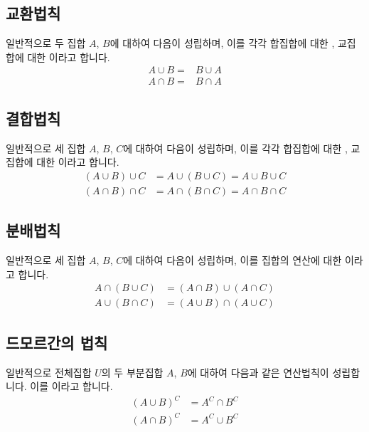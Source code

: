 \clearpage
\subsection{교환법칙}
일반적으로 두 집합 $A$, $B$에 대하여 다음이 성립하며, 이를 각각 합집합에 대한 , 교집합에 대한 이라고 합니다.
\begin{align*}
    A\cup B =& B \cup A\\
    A\cap B =& B \cap A
\end{align*}
\subsection{결합법칙}
일반적으로 세 집합 $A$, $B$, $C$에 대하여 다음이 성립하며, 이를 각각 합집합에 대한 , 교집합에 대한 이라고 합니다.
\begin{align*}
    \left( A\cup B \right) \cup C &= A\cup \left( B\cup C  \right) = A\cup B \cup C \\
    \left( A\cap B \right) \cap C &= A\cap \left( B\cap C  \right) =  A\cap B \cap C
\end{align*}

\subsection{분배법칙}
일반적으로 세 집합 $A$, $B$, $C$에 대하여 다음이 성립하며, 이를 집합의 연산에 대한 이라고 합니다.
\begin{align*}
    A \cap\left( B \cup C  \right) &= \left( A \cap B \right) \cup \left( A\cap C \right)   \\
    A \cup\left( B \cap C  \right) &= \left( A \cup B \right) \cap \left( A\cup C \right) 
\end{align*}

\subsection{드모르간의 법칙}
일반적으로 전체집합 $U$의 두 부분집합 $A$, $B$에 대하여 다음과 같은 연산법칙이 성립합니다. 이를 이라고 합니다.
\begin{align*}
\left( A \cup B \right)^C &=A^C \cap B^C \\
\left( A \cap B \right)^C &=A^C \cup B^C \\
\end{align*}


